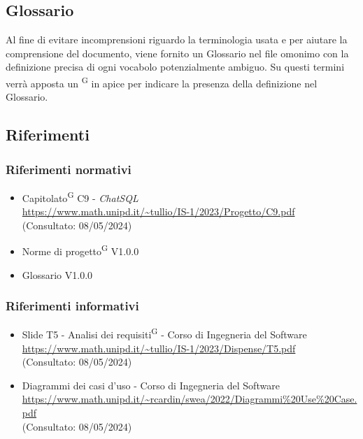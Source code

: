 \subsection{Glossario}
Al fine di evitare incomprensioni riguardo la terminologia usata e per aiutare la comprensione del documento, viene fornito un Glossario nel file omonimo con la definizione precisa di ogni vocabolo potenzialmente ambiguo. Su questi termini verrà apposta un \textsuperscript{G} in apice per indicare la presenza della definizione nel Glossario.

\subsection{Riferimenti}
\subsubsection{Riferimenti normativi}
\begin{itemize}
	\item Capitolato\textsuperscript{G} C9 - \textit{ChatSQL} \\ \url{https://www.math.unipd.it/~tullio/IS-1/2023/Progetto/C9.pdf} \\ (Consultato: 08/05/2024)
	\item Norme di progetto\textsuperscript{G} V1.0.0 
	\item Glossario V1.0.0
\end{itemize}

\subsubsection{Riferimenti informativi}
\begin{itemize}
	\item Slide T5 - Analisi dei requisiti\textsuperscript{G} - Corso di Ingegneria del Software \\ \url{https://www.math.unipd.it/~tullio/IS-1/2023/Dispense/T5.pdf} \\ (Consultato: 08/05/2024)
	\item Diagrammi dei casi d'uso - Corso di Ingegneria del Software \\ \url{https://www.math.unipd.it/~rcardin/swea/2022/Diagrammi%20Use%20Case.pdf} \\ (Consultato: 08/05/2024)
\end{itemize}